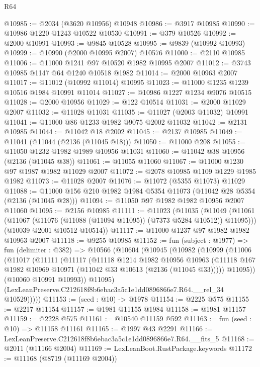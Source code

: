 \begin{lexlean}{R64}
\begin{coremodule}
@10985 := @2034 (@3620 @10956) @10948
@10986 := @3917 @10985
@10990 := @10986 @1220 @1243 @10522 @10530
@10991 := @379 @10526
@10992 := @2000 @10991
@10993 := @9845 @10528
@10995 := @9839 (@10992 @10993)
@10999 := @10990 (@2000 @10995 @2007) @10576
@11000 := @2110 @10985
@11006 := @11000 @1241 @97 @10520 @1982 @10995 @2007
@11012 := @3743 @10985 @1147 @64 @1240 @10518 @1982
@11014 := @2000 @10963 @2007
@11017 := @11012 (@10992 @11014) @10995
@11023 := @11000 @1235 @1239 @10516 @1984 @10991 @11014
@11027 := @10986 @1227 @1234 @9076 @10515
@11028 := @2000 @10956
@11029 := @122 @10514
@11031 := @2000 @11029 @2007
@11032 := @11028 @11031
@11035 := @11027 (@2003 @11032) @10991
@11041 := @11000 @86 @1233 @1982 @9075 @2002 @11032
@11042 := @2131 @10985
@11044 := @11042 @18 @2002
@11045 := @2137 @10985
@11049 := @11041 (@11044 (@2136 (@11045 @18)))
@11050 := @11000 @208
@11055 := @11050 @1232 @1982 @1989 @10956 @11031
@11060 := @11042 @38 @10956 (@2136 (@11045 @38))
@11061 := @11055 @11060
@11067 := @11000 @1230 @97 @1987 @1982 @11029 @2007
@11072 := @2078 @10985 @1109 @1229 @1985 @1982
@11073 := @11028 @2007
@11076 := @11072 (@5355 @11073) @11029
@11088 := @11000 @156 @210 @1982 @1984 @5354 @11073 (@11042 @28 @5354 (@2136 (@11045 @28)))
@11094 := @11050 @97 @1982 @1982 @10956 @2007 @11060
@11095 := @2156 @10985
@11111 := @11023
    (@11035
      (@11049 (@11061 (@11067 (@11076 (@11088 (@11094 @11095)) (@7373 @5284 @10512)) @11095)))
      (@10039 @2001 @10512 @10514))
@11117 := @11000 @1237 @97 @1982 @1982 @10963 @2007
@11118 := @9255 @10985
@11152 := fun (subject : @1977) =>
  fun (delimiter : @382) =>
  @10566
    (@10604
      (@10945
        (@10982
          (@10999
            (@11006
              (@11017
                (@11111
                  (@11117
                    (@11118
                      @1214
                      @1982
                      @10956
                      @10963
                      (@11118 @167 @1982 @10969 @10971 (@11042 @33 @10613 (@2136 (@11045 @33)))))
                    @11095))
                (@10060 @10991 @10993))
              @11095)
            (LexLeanPreserve.C212618f8b6ebac3a5c1e1dd0896866e7.R64.__rel_34 @10529)))))
@11153 := (seed : @10) -> @1978
@11154 := @2225 @575
@11155 := @2217 @11154
@11157 := @1981 @11155 @1984
@11158 := @1981 @11157
@11159 := @2228 @575
@11161 := @10540 @11159 @592
@11163 := fun (seed : @10) => @11158 @11161
@11165 := @1997 @43 @2291
@11166 := LexLeanPreserve.C212618f8b6ebac3a5c1e1dd0896866e7.R64.__fits_5
@11168 := @2011 (@11166 @2004)
@11169 := LexLeanBoot.RustPackage.keywords
@11172 := @11168 (@8719 (@11169 @2004))

\end{coremodule}
\end{lexlean}
